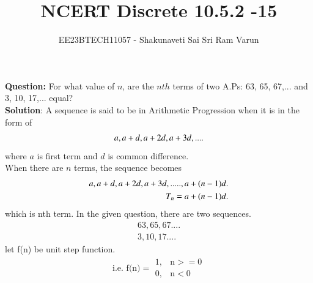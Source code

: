 \documentclass[journal,12pt,twocolumn]{IEEEtran}
\theoremstyle{remark}
\begin{document}

\vspace{3cm}

\title{NCERT Discrete 10.5.2 -15}
\author{EE23BTECH11057 - Shakunaveti Sai Sri Ram Varun$^{}$%
}
\maketitle
\newpage
\bigskip

\renewcommand{\thefigure}{\theenumi}
\renewcommand{\thetable}{\theenumi}
\vspace{2cm}
\textbf{Question: }
For what value of $ n$, are the $ nth$ terms of two A.Ps: 63, 65, 67,... and 3, 10, 17,... equal?\\
\vspace{0.5cm}
\textbf{Solution}:
A sequence is said to be in Arithmetic Progression when it is in the form of
\begin{align}
\notag a, a+d, a+2d, a+3d,....
\end{align}
where $a$ is first term and $d$ is common difference.\\
When there are $ n$ terms, the sequence becomes
\begin{align}
\notag a, a+d, a+2d, a+3d,....., a+(n-1)d.\\
\notag T_n = a+(n-1)d.
\end{align}
which is nth term.
In the given question, there are two sequences.
\begin{align}
63, 65, 67....\label{eq:1}\\
3, 10, 17....\label{eq:2}
\end{align}
let f(n) be unit step function.\\
\begin{align}
\text{i.e. f(n)}=
\begin{array}{lr}
    1,&\text{n}>=0\\
    0,&\text{n}<0
\end{array}
\end{align}
\end{document}
